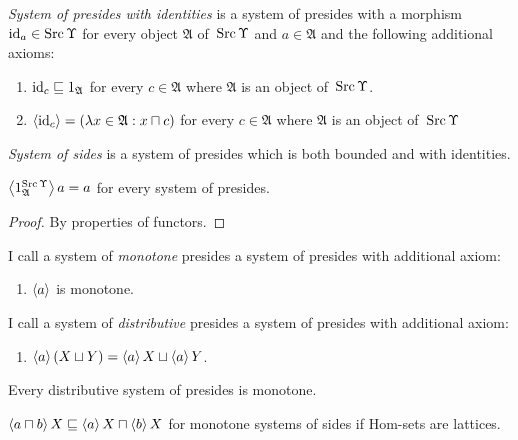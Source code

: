 \begin{defn}
\emph{System of presides with identities} is a system of presides with
a morphism $\operatorname{id}_a\in\operatorname{Src}\Upsilon$ for every object $\mathfrak{A}$ of~$\operatorname{Src}\Upsilon$ and $a\in\mathfrak{A}$
and the following additional axioms:
\begin{enumerate}
  \item $\operatorname{id}_c \sqsubseteq 1_{\mathfrak{A}}$ for every $c \in \mathfrak{A}$
    where $\mathfrak{A}$ is an object of~$\operatorname{Src}\Upsilon$.

  \item $\left\langle \operatorname{id}_c\right\rangle = (\lambda x \in \mathfrak{A}: x \sqcap c)$ for every $c \in \mathfrak{A}$
    where $\mathfrak{A}$ is an object of~$\operatorname{Src}\Upsilon$
\end{enumerate}
\end{defn}

\begin{defn}
\emph{System of sides} is a system of presides which is both bounded and with identities.
\end{defn}

\begin{prop}
$\left\langle 1^{\operatorname{Src}\Upsilon}_\mathfrak{A}\right\rangle a = a$ for every system of presides.
\end{prop}

\begin{proof}
By properties of functors.
\end{proof}

\begin{defn}
I call a system of \emph{monotone} presides a system of presides with additional axiom:
\begin{enumerate}
\item $\left\langle a\right\rangle$ is monotone.
\end{enumerate}
\end{defn}

\begin{defn}
I call a system of \emph{distributive} presides a system of presides with additional axiom:
\begin{enumerate}
\item $\left\langle a\right\rangle(X\sqcup Y) = \left\langle a\right\rangle X\sqcup\left\langle a\right\rangle Y$.
\end{enumerate}
\end{defn}

\begin{obvious}
Every distributive system of presides is monotone.
\end{obvious}

\begin{prop}
$\left\langle a \sqcap b\right\rangle X \sqsubseteq \left\langle a\right\rangle X \sqcap \left\langle b\right\rangle X$ for monotone systems of sides
if Hom-sets are lattices.
\end{prop}

